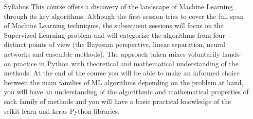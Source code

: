 \documentclass{beamer}
\begin{document}
\begin{frame}{Syllabus}
This course offers a discovery of the landscape of Machine Learning through its key algorithms. Although the first session tries to cover the full span of Machine Learning techniques, the subsequent sessions will focus on the Supervized Learning problem and will categorize the algorithms from four distinct points of view (the Bayesian perspective, linear separation, neural networks and ensemble methods). The approach taken mixes voluntarily hands-on practice in Python with theoretical and mathematical understanding of the methods. At the end of the course you will be able to make an informed choice between the main families of ML algorithms depending on the problem at hand, you will have an understanding of the algorithmic and mathematical properties of each family of methods and you will have a basic practical knowledge of the scikit-learn and keras Python libraries.

\end{frame}
\end{document}
